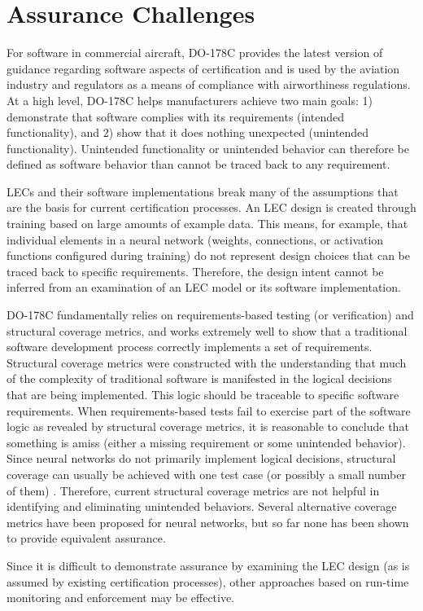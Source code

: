 \section{Assurance Challenges}

For software in commercial aircraft, DO-178C \cite{DO-178} provides
the latest version of guidance regarding software aspects of
certification and is used by the aviation industry and regulators
as a means of compliance with airworthiness regulations.
At a high level, DO-178C helps manufacturers achieve two
main goals: 1) demonstrate that software complies with
its requirements (intended functionality), and 2) show that it does
nothing unexpected (unintended functionality). Unintended
functionality or unintended behavior can therefore be defined
as software behavior than cannot be traced back to any requirement.

LECs and their software implementations
break many of the assumptions that are the basis for current
certification processes. An LEC design
is created through training based on large amounts of example
data.  This means, for example, that individual elements
in a neural network (weights, connections, or activation 
functions configured during training) do not represent design 
choices that can be traced back to specific requirements.
Therefore, the design intent cannot
be inferred from an examination of an LEC model or its
software implementation.  

DO-178C fundamentally relies on requirements-based testing
(or verification) and structural coverage metrics, and works 
extremely well to show that a traditional software development process 
correctly implements a set of requirements.  
Structural coverage metrics were constructed with the understanding
that much of the complexity of traditional software
is manifested in the logical decisions that are being implemented.
This logic should be traceable to specific software
requirements. When requirements-based tests fail to exercise
part of the software logic as revealed by structural coverage
metrics, it is reasonable to conclude that something is amiss
(either a missing requirement or some unintended behavior).
Since neural networks do not primarily implement logical
decisions, structural coverage can usually be achieved with one
test case (or possibly a small number of them) \cite{whitebox}. 
Therefore, current structural coverage metrics are not
helpful in identifying and eliminating unintended behaviors. 
Several alternative coverage metrics have been proposed for 
neural networks, but so far none has been shown to provide
equivalent assurance.  

Since it is difficult to demonstrate assurance by examining
the LEC design (as is assumed by existing certification processes),
other approaches based on run-time monitoring and
enforcement may be effective. 